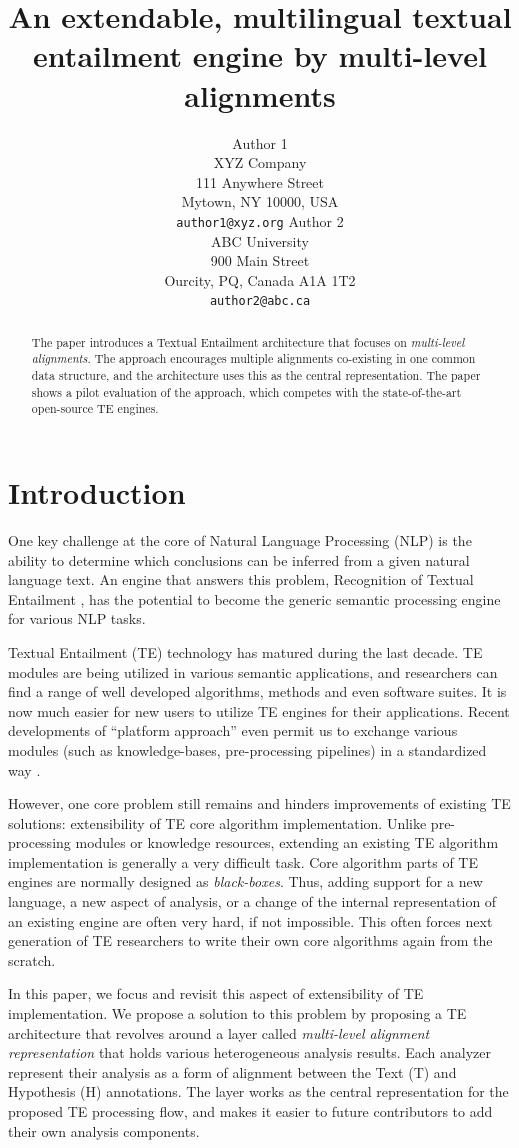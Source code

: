 \documentclass[11pt,letterpaper]{article}
\title{An extendable, multilingual textual entailment engine by
  multi-level alignments}
\author{Author 1\\
	    XYZ Company\\
	    111 Anywhere Street\\
	    Mytown, NY 10000, USA\\
	    {\tt author1@xyz.org}
	  \And
	Author 2\\
  	ABC University\\
  	900 Main Street\\
  	Ourcity, PQ, Canada A1A 1T2\\
  {\tt author2@abc.ca}}
\date{}
\begin{document}
\maketitle
\begin{abstract}
The paper introduces a Textual Entailment architecture that focuses
on {\em multi-level alignments}. The approach encourages multiple
alignments co-existing in one common data structure, and the
architecture uses this as the central representation. The paper shows
a pilot evaluation of the approach, which competes with the
state-of-the-art open-source TE engines. 
\end{abstract}

\section{Introduction}
One key challenge at the core of Natural Language Processing (NLP) is
the ability to determine which conclusions can be inferred from a
given natural language text. An engine that answers this problem,
Recognition of Textual Entailment \cite{}, has the potential to
become the generic semantic processing engine for various NLP tasks.     

Textual Entailment (TE) technology has matured during the last
decade. TE modules are being utilized in various semantic
applications, and researchers can find a range of well developed
algorithms, methods and even software suites. It is now much easier
for new users to utilize TE engines for their applications. Recent 
developments of ``platform approach'' even permit us to exchange
various modules (such as knowledge-bases, pre-processing pipelines) in
a standardized way \cite{}. 

However, one core problem still remains and hinders improvements of  
existing TE solutions: extensibility of TE core algorithm
implementation. Unlike pre-processing modules or knowledge resources,   
extending an existing TE algorithm implementation is generally a very
difficult task. Core algorithm parts of TE engines are normally
designed as {\em black-boxes}. Thus, adding support for a new
language, a new aspect of analysis, or a change of the internal
representation of an existing engine are often very hard, if not
impossible. This often forces next generation of TE researchers to
write their own core algorithms again from the scratch.

In this paper, we focus and revisit this aspect of extensibility of TE
implementation. We propose a solution to this problem by proposing a 
TE architecture that revolves around a layer called {\em multi-level
  alignment representation} that holds various heterogeneous analysis
results. Each analyzer represent their analysis as a form of alignment
between the Text (T) and Hypothesis (H) annotations. The layer works
as the central representation for the proposed TE processing flow, and
makes it easier to future contributors to add their own analysis
components. 
\end{document}
